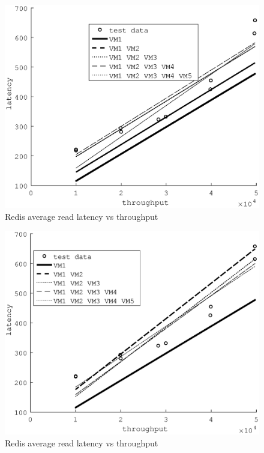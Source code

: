 \documentclass{acm_proc_article-sp}
\begin{document}
\begin{figure}
\centering
\includegraphics[scale = 0.5]{fit_read_avg_latency_r3_2x_r3_x_m3_2x_m3_x_r3__m3_.eps}
\caption{Redis average read latency vs throughput}
\label{figure:redisbarread}
\end{figure}

\begin{figure}
\centering
\includegraphics[scale = 0.5]{fit_read_avg_latency_r3_2x_r3__m3_2x_m3__r3_x_m3_x.eps}
\caption{Redis average read latency vs throughput}
\label{figure:redisbarread}
\end{figure}
\end{document}
